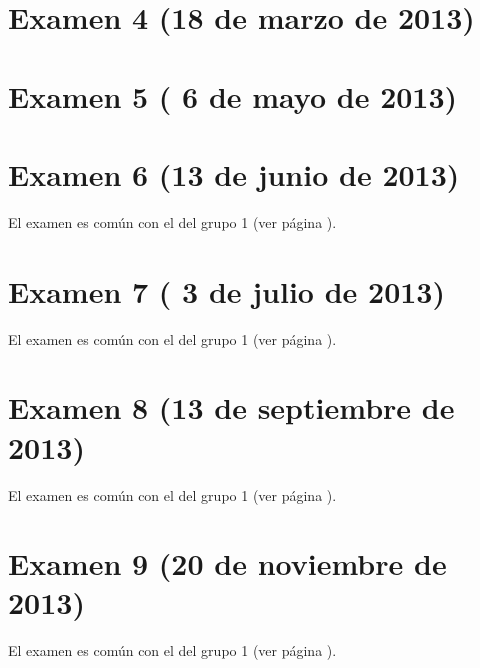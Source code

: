 \documentclass[a4paper,12pt,twoside]{book}
\begin{document}
\section{Examen 4 (18 de marzo de 2013)}
\section{Examen 5 ( 6 de mayo de 2013)} 
\section{Examen 6 (13 de junio de 2013)} 
El examen es común con el del grupo 1 (ver página \pageref{examen_12_13_1_6}). 
\section{Examen 7 ( 3 de julio de 2013)} 
El examen es común con el del grupo 1 (ver página \pageref{examen_12_13_1_7}). 
\section{Examen 8 (13 de septiembre de 2013)} 
El examen es común con el del grupo 1 (ver página \pageref{examen_12_13_1_8}).
\section{Examen 9 (20 de noviembre de 2013)} 
El examen es común con el del grupo 1 (ver página \pageref{examen_12_13_1_9}).

\appendix %






\nocite{Alonso-12b}
\nocite{Bird-99a}
\nocite{Cunningham-10a}
\nocite{Daume-06}
\nocite{Davie-92a}
\nocite{Doets-04a}
\nocite{Fokker-96}
\nocite{Hudak-00a}
\nocite{Hudak-12a}
\nocite{Hutton-07a}
\nocite{OSullivan-08a}
\nocite{Rabhi-99a}
\nocite{Polya-65a}
\nocite{Ruiz-04}
\nocite{Thompson-11a}



\end{document}
